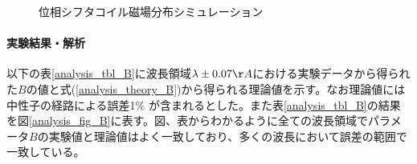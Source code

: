\begin{figure}[H]
\begin{center}
\vspace{-1mm}
\label{analysis_fig_PSS_danmen}
\vspace{-3mm}
\end{center}
\caption{位相シフタコイル磁場分布シミュレーション} \label{analysis_fig_PhaseShifterSimulation}
\end{figure}

\paragraph{実験結果・解析}
以下の表\ref{analysis_tbl_B}に波長領域$\lambda \pm 0.07 \AA$における実験データから得られた$B$の値と式(\ref{analysis_theory_B})から得られる理論値を示す。なお理論値には中性子の経路による誤差1\% が含まれるとした。また表\ref{analysis_tbl_B}の結果を図\ref{analysis_fig_B}に表す。図、表からわかるように全ての波長領域でパラメータ$B$の実験値と理論値はよく一致しており、多くの波長において誤差の範囲で一致している。

